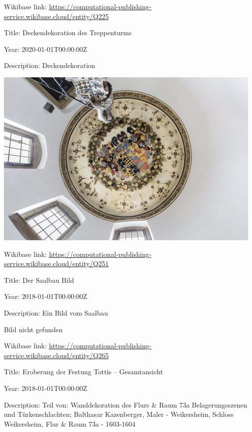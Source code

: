 \documentclass[
  letterpaper,
]{book}
\begin{document}
Wikibase link:
\url{https://computational-publishing-service.wikibase.cloud/entity/Q225}

Title: Deckendekoration des Treppenturms

Year: 2020-01-01T00:00:00Z

Description: Deckendekoration

\includegraphics{paintings_files/figure-pdf/cell-3-output-80.png}

Wikibase link:
\url{https://computational-publishing-service.wikibase.cloud/entity/Q251}

Title: Der Saalbau Bild

Year: 2018-01-01T00:00:00Z

Description: Ein Bild vom Saalbau

Bild nicht gefunden

Wikibase link:
\url{https://computational-publishing-service.wikibase.cloud/entity/Q265}

Title: Eroberung der Festung Tottis -- Gesamtansicht

Year: 2018-01-01T00:00:00Z

Description: Teil von: Wanddekoration des Flurs \& Raum 73a
Belagerungsszenen und Türkenschlachten; Balthasar Kazenberger, Maler -
Weikersheim, Schloss Weikersheim, Flur \& Raum 73a - 1603-1604
\end{document}
